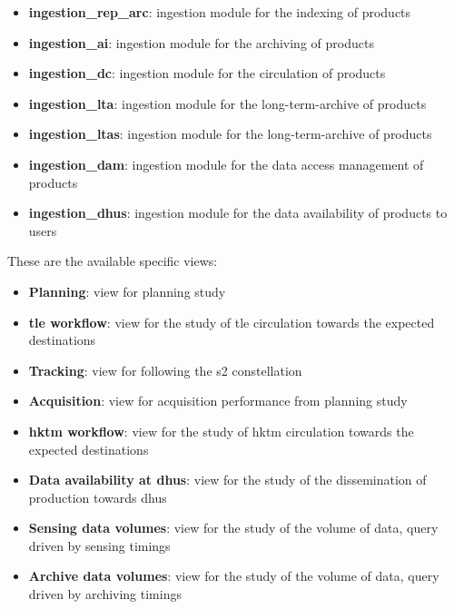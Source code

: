 \begin{itemize}
\item \textbf{ingestion\_rep\_arc}: ingestion module for the indexing of products

\item \textbf{ingestion\_ai}: ingestion module for the archiving of products

\item \textbf{ingestion\_dc}: ingestion module for the circulation of products

\item \textbf{ingestion\_lta}: ingestion module for the long-term-archive of products

\item \textbf{ingestion\_ltas}: ingestion module for the long-term-archive of products

\item \textbf{ingestion\_dam}: ingestion module for the data access management of products

\item \textbf{ingestion\_dhus}: ingestion module for the data availability of products to users

\end{itemize}

These are the available specific views:

\begin{itemize} 

\item \textbf{Planning}: view for planning study

\item \textbf{\acrshort{tle} workflow}: view for the study of \acrshort{tle} circulation towards the expected destinations

\item \textbf{Tracking}: view for following the \acrshort{s2} constellation
  
\item \textbf{Acquisition}: view for acquisition performance from planning study

\item \textbf{\acrshort{hktm} workflow}: view for the study of \acrshort{hktm} circulation towards the expected destinations

\item \textbf{Data availability at \acrshort{dhus}}: view for the study of the dissemination of production towards \acrshort{dhus}

\item \textbf{Sensing data volumes}: view for the study of the volume of data, query driven by sensing timings

\item \textbf{Archive data volumes}: view for the study of the volume of data, query driven by archiving timings
  
\end{itemize}

